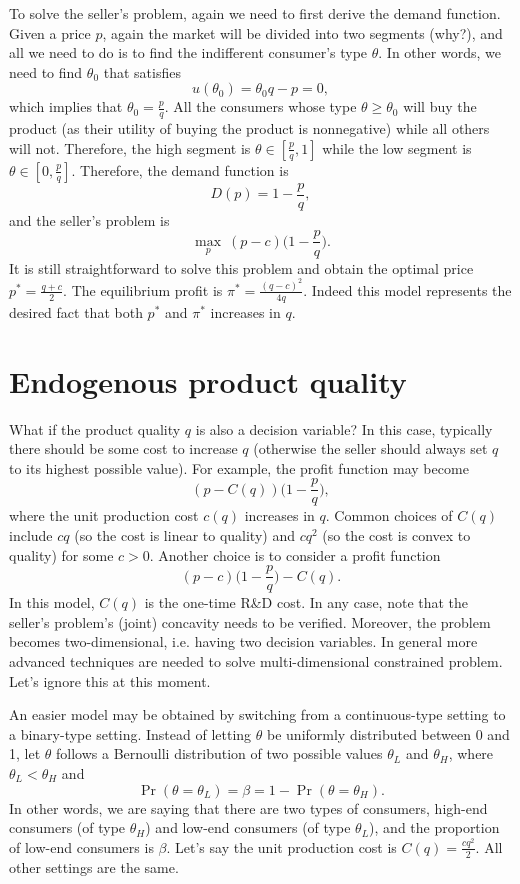\documentclass[11pt,a4paper]{article}
\begin{document}
To solve the seller's problem, again we need to first derive the demand function.
Given a price $p$, again the market will be divided into two segments (why?),
and all we need to do is to find the indifferent consumer's type $\theta$.
In other words, we need to find $\theta_0$ that satisfies
\[
	u(\theta_0) = \theta_0 q - p = 0,
\]
which implies that $\theta_0 = \frac{p}{q}$. All the consumers whose type
$\theta \geq \theta_0$ will buy the product (as their utility of buying
the product is nonnegative) while all others will not. Therefore,
the high segment is $\theta \in [\frac{p}{q}, 1]$ while the low segment
is $\theta \in [0, \frac{p}{q}]$.
Therefore, the demand function is
\[
	D(p) = 1 - \frac{p}{q},
\]
and the seller's problem is
\[
	\max_p \ (p - c)\bigg(1 - \frac{p}{q}\bigg).
\]
It is still straightforward to solve this problem and obtain the optimal price
$p^* = \frac{q + c}{2}$. The equilibrium profit is $\pi^* = \frac{(q - c)^2}{4q}$.
Indeed this model represents the desired fact that both $p^*$ and $\pi^*$ increases
in $q$.







\section{Endogenous product quality}

What if the product quality $q$ is also a decision variable?
In this case, typically there should be some cost to increase $q$
(otherwise the seller should always set $q$ to its highest possible value).
For example, the profit function may become
\[
	(p - C(q))\bigg(1 - \frac{p}{q}\bigg),
\]
where the unit production cost $c(q)$ increases in $q$.
Common choices of $C(q)$ include $cq$ (so the cost is linear to quality)
and $cq^2$ (so the cost is convex to quality) for some $c > 0$.
Another choice is to consider a profit function
\[
	(p - c)\bigg(1 - \frac{p}{q}\bigg) - C(q).
\]
In this model, $C(q)$ is the one-time R\&D cost. In any case,
note that the seller's problem's (joint) concavity needs to be verified.
Moreover, the problem becomes two-dimensional, i.e. having two decision variables.
In general more advanced techniques are needed to solve multi-dimensional
constrained problem. Let's ignore this at this moment.

An easier model may be obtained by switching from a continuous-type setting
to a binary-type setting. Instead of letting $\theta$ be uniformly distributed
between 0 and 1, let $\theta$ follows a Bernoulli distribution of two possible
values $\theta_L$ and $\theta_H$, where $\theta_L < \theta_H$ and
\[
	\Pr(\theta = \theta_L) = \beta = 1 - \Pr(\theta = \theta_H).
\]
In other words, we are saying that there are two types of consumers,
high-end consumers (of type $\theta_H$) and low-end consumers (of type $\theta_L$),
and the proportion of low-end consumers is $\beta$.
Let's say the unit production cost is $C(q) = \frac{cq^2}{2}$.
All other settings are the same.
\end{document}
